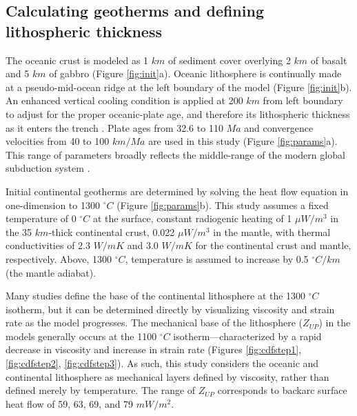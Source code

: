 \hypertarget{calculating-geotherms-and-defining-lithospheric-thickness}{%
\subsection{Calculating geotherms and defining lithospheric thickness}\label{calculating-geotherms-and-defining-lithospheric-thickness}}

The oceanic crust is modeled as 1 \(km\) of sediment cover overlying 2 \(km\) of basalt and 5 \(km\) of gabbro (Figure \ref{fig:init}a). Oceanic lithosphere is continually made at a pseudo-mid-ocean ridge at the left boundary of the model (Figure \ref{fig:init}b). An enhanced vertical cooling condition is applied at 200 \(km\) from left boundary to adjust for the proper oceanic-plate age, and therefore its lithospheric thickness as it enters the trench \citep{Agrusta2013}. Plate ages from 32.6 to 110 \(Ma\) and convergence velocities from 40 to 100 \(km/Ma\) are used in this study (Figure \ref{fig:params}a). This range of parameters broadly reflects the middle-range of the modern global subduction system \citep{Syracuse2006}.

Initial continental geotherms are determined by solving the heat flow equation in one-dimension to 1300 \(^{\circ}C\) (Figure \ref{fig:params}b). This study assumes a fixed temperature of 0 \(^{\circ}C\) at the surface, constant radiogenic heating of 1 \(\mu W/m^{3}\) in the 35 \(km\)-thick continental crust, 0.022 \(\mu W/m^{3}\) in the mantle, with thermal conductivities of 2.3 \(W/mK\) and 3.0 \(W/mK\) for the continental crust and mantle, respectively. Above, 1300 \(^{\circ}C\), temperature is assumed to increase by 0.5 \(^{\circ}C/km\) (the mantle adiabat).

Many studies define the base of the continental lithosphere at the 1300 \(^{\circ}C\) isotherm, but it can be determined directly by visualizing viscosity and strain rate as the model progresses. The mechanical base of the lithosphere (\(Z_{UP}\)) in the models generally occurs at the 1100 \(^{\circ}C\) isotherm---characterized by a rapid decrease in viscosity and increase in strain rate (Figures \ref{fig:cdfstep1}, \ref{fig:cdfstep2}, \ref{fig:cdfstep3}). As such, this study considers the oceanic and continental lithosphere as mechanical layers defined by viscosity, rather than defined merely by temperature. The range of \(Z_{UP}\) corresponds to backarc surface heat flow of 59, 63, 69, and 79 \(mW/m^{2}\).

\cleardoublepage

